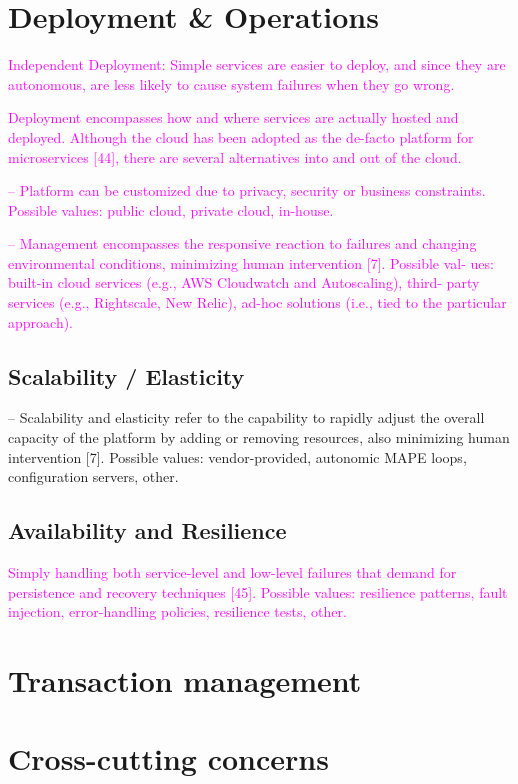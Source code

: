 \documentclass[thesis=M,english,hidelinks]{FITthesis}[2012/10/20]
\begin{document}
\section{Deployment \& Operations}
\textcolor{magenta}{Independent Deployment: Simple services are easier to deploy, and since they are autonomous, are less likely to cause system failures when they go wrong.}

\textcolor{magenta}{Deployment encompasses how and where services are actually hosted and deployed. Although the cloud has been adopted as the de-facto platform for microservices [44], there are several alternatives into and out of the cloud.}

\textcolor{magenta}{– Platform can be customized due to privacy, security or business constraints. Possible values: public cloud, private cloud, in-house.}

\textcolor{magenta}{– Management encompasses the responsive reaction to failures and changing environmental conditions, minimizing human intervention [7]. Possible val- ues: built-in cloud services (e.g., AWS Cloudwatch and Autoscaling), third- party services (e.g., Rightscale, New Relic), ad-hoc solutions (i.e., tied to the particular approach).}

\subsection{Scalability / Elasticity}
– Scalability and elasticity refer to the capability to rapidly adjust the overall capacity of the platform by adding or removing resources, also minimizing human intervention [7]. Possible values: vendor-provided, autonomic MAPE loops, configuration servers, other.
\subsection{Availability and Resilience}
\textcolor{magenta}{Simply handling both service-level and low-level failures that demand for persistence and recovery techniques [45]. Possible values: resilience patterns, fault injection, error-handling policies, resilience tests, other.}
% 
% 
\section{Transaction management}


% 
%
\section{Cross-cutting concerns}
\end{document}
